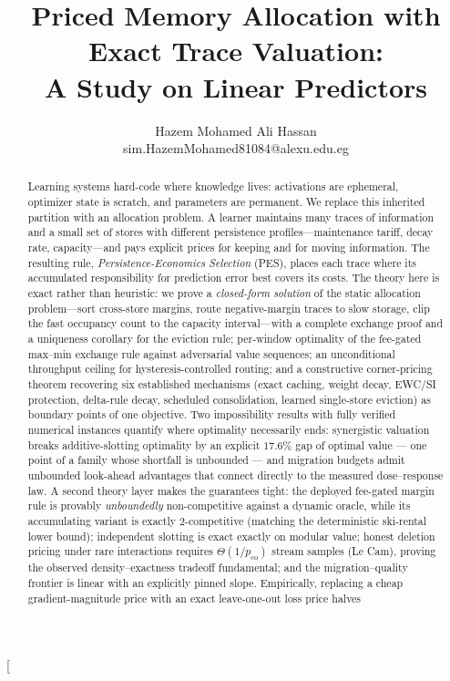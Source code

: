 \documentclass[10pt,twocolumn]{article}
\title{Priced Memory Allocation with Exact Trace Valuation:\\[4pt]
\large A Study on Linear Predictors}
\author{Hazem Mohamed Ali Hassan\\\small sim.HazemMohamed81084@alexu.edu.eg}
\date{}
\theoremstyle{definition}
\newcommand{\PES}{PES}
\begin{document}
\twocolumn[
\begin{@twocolumnfalse}
\maketitle
\begin{abstract}
Learning systems hard-code where knowledge lives: activations are ephemeral, optimizer state is scratch,
and parameters are permanent. We replace this inherited partition with an allocation problem. A learner
maintains many traces of information and a small set of stores with different persistence
profiles---maintenance tariff, decay rate, capacity---and pays explicit prices for keeping and for moving
information. The resulting rule, \emph{Persistence-Economics Selection} (\PES), places each trace where its
accumulated responsibility for prediction error best covers its costs. The theory here is exact rather than
heuristic: we prove a \emph{closed-form solution} of the static
allocation problem---sort cross-store margins, route negative-margin traces to slow storage, clip the fast
occupancy count to the capacity interval---with a complete exchange proof and a uniqueness corollary for the
eviction rule; per-window optimality of the fee-gated max--min exchange rule against adversarial value
sequences; an unconditional throughput ceiling for hysteresis-controlled routing; and a constructive
corner-pricing theorem recovering six established mechanisms (exact caching, weight decay, EWC/SI
protection, delta-rule decay, scheduled consolidation, learned single-store eviction) as boundary points of
one objective. Two impossibility results with fully verified numerical instances quantify where optimality
necessarily ends: synergistic valuation breaks additive-slotting optimality by an explicit $17.6\%$ gap of
optimal value --- one point of a family whose shortfall is unbounded --- and
migration budgets admit unbounded look-ahead advantages that connect directly to the measured dose--response
law. A second theory layer makes the guarantees tight: the deployed fee-gated margin rule is provably
\emph{unboundedly} non-competitive against a dynamic oracle, while its accumulating variant is exactly
$2$-competitive (matching the deterministic ski-rental lower bound); independent slotting is exact exactly
on modular value; honest deletion pricing under rare interactions requires $\Theta(1/p_{\mathrm{co}})$
stream samples (Le Cam), proving the observed density--exactness tradeoff fundamental; and the
migration--quality frontier is linear with an explicitly pinned slope. Empirically, replacing a cheap gradient-magnitude price with an exact leave-one-out loss price halves

\end{abstract}
\end{@twocolumnfalse}
\end{document}

